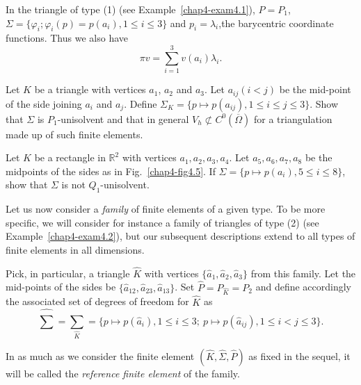 \begin{example}\label{chap5-exam5.1}
In the triangle of type (1) (see Example~\ref{chap4-exam4.1}),
$P=P_{1}$, $\Sigma=\{\varphi_{i};\varphi_{i}(p)=p(a_{i}),1\leq i\leq
3\}$ and $p_{i}=\lambda_{i}$,\pageoriginale the barycentric coordinate
functions. Thus we also have
\begin{equation*}
\pi v=\sum^{3}_{i=1}v(a_{i})\lambda_{i}.\tag{5.4}
\end{equation*}
\end{example}

\begin{exercise}\label{chap5-exer5.1}
Let $K$ be a triangle with vertices $a_{1}$, $a_{2}$ and $a_{3}$. Let
$a_{ij}(i<j)$ be the mid-point of the side joining $a_{i}$ and
$a_{j}$. Define $\Sigma_{K}=\{p\mapsto p(a_{ij}),1\leq i\leq j\leq
3\}$. Show that $\Sigma$ is $P_{1}$-unisolvent and that in general
$V_{h}\not\subset C^{0}(\overline{\Omega})$ for a triangulation made
up of such finite elements.
\end{exercise}

\begin{exercise}\label{chap5-exer5.2}
Let $K$ be a rectangle in $\mathbb{R}^{2}$ with vertices
$a_{1},a_{2},a_{3},a_{4}$. Let $a_{5},a_{6},a_{7},a_{8}$ be the
midpoints of the sides as in Fig.~\ref{chap4-fig4.5}. If
$\Sigma=\{p\mapsto p(a_{i}), 5\leq i\leq 8\}$, show that $\Sigma$ is
not $Q_{1}$-unisolvent.
\end{exercise}

Let us now consider a {\em family} of finite elements of a given
type. To be more specific, we will consider for instance a family of
triangles of type (2) (see Example~\ref{chap4-exam4.2}), but our
subsequent descriptions extend to all types of finite elements in all
dimensions. 

Pick, in particular, a triangle $\hat{K}$ with vertices
$\{\hat{a}_{1},\hat{a}_{2},\hat{a}_{3}\}$ from this family. Let the
mid-points of the sides be
$\{\hat{a}_{12},\hat{a}_{23},\hat{a}_{13}\}$. Set
$\hat{P}=P_{\hat{K}}=P_{2}$ and define accordingly the associated set
of degrees of freedom for $\hat{K}$ as
$$
\hat{\sum}=\sum_{\hat{K}}=\{p\mapsto p(\hat{a}_{i}),1\leq i\leq
3;\ p\mapsto p(\hat{a}_{ij}), 1\leq i<j\leq 3\}.
$$

In as much as we consider the finite element
$(\hat{K},\hat{\Sigma},\hat{P})$ as fixed in the sequel, it will be
called the {\em reference finite element} of the family.

